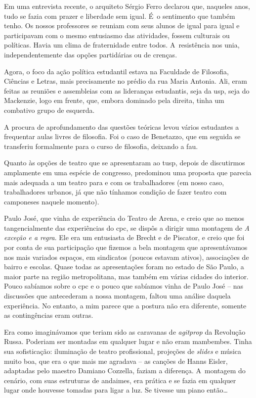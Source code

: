 Em uma entrevista recente, o arquiteto Sérgio Ferro declarou que,
naqueles anos, tudo se fazia com prazer e liberdade sem igual. É~o
sentimento que também tenho. Os nossos professores se reuniam com seus
alunos de igual para igual e participavam com o mesmo entusiasmo das
atividades, fossem culturais ou políticas. Havia um clima de
fraternidade entre todos. A~resistência nos unia, independentemente das
opções partidárias ou de crenças.

Agora, o foco da ação política estudantil estava na Faculdade de
Filosofia, Ciências e Letras, mais precisamente no prédio da rua Maria
Antonia. Ali, eram feitas as reuniões e assembleias com as
lideranças estudantis, seja da {\sc usp}, seja do Mackenzie, logo em frente, que,
embora dominado pela direita, tinha um combativo grupo de esquerda.

A procura de aprofundamento das questões teóricas levou vários
estudantes a frequentar aulas livres de filosofia. Foi o caso de
Benetazzo, que em seguida se transferiu formalmente para o curso de filosofia,
deixando a {\sc fau}.

Quanto às opções de teatro que se apresentaram ao {\sc tusp}, depois de
discutirmos amplamente em uma espécie de congresso,
predominou uma proposta que parecia mais adequada a um teatro para e com
os trabalhadores (em nosso caso, trabalhadores urbanos, já que não
tínhamos condição de fazer teatro com camponeses naquele momento).

Paulo José, que vinha de experiência do Teatro de Arena, e creio que ao
menos tangencialmente das experiências do {\sc cpc}, se dispôs a dirigir uma
montagem de {\it A exceção e a regra}. Ele era um entusiasta de Brecht e
de Piscator, e creio que foi por conta de sua participação que fizemos a bela
montagem que apresentávamos nos mais variados
espaços, em sindicatos (poucos estavam ativos), associações de bairro e
escolas. Quase todas as apresentações foram no estado de São Paulo, a
maior parte na região metropolitana, mas também em várias cidades do
interior. Pouco sabíamos sobre o {\sc cpc} e o pouco que sabíamos vinha de
Paulo José -- nas discussões que antecederam a nossa montagem, faltou uma
análise daquela experiência. No entanto, a mim parece que a postura não
era diferente, somente as contingências eram outras.

Era como imaginávamos que teriam sido as caravanas de {\it agitprop} da
Revolução Russa. Poderiam ser montadas em qualquer lugar e não eram
mambembes. Tinha sua sofisticação: iluminação de teatro profissional,
projeções de {\it slides} e música muito boa, que era o que mais me agradava -- as
canções de Hanns Eisler, adaptadas pelo maestro Damiano Cozzella, faziam a
diferença. A~montagem do cenário, com suas estruturas de andaimes, era
prática e se fazia em qualquer lugar onde houvesse tomadas para ligar a
luz. Se tivesse um piano então\ldots{}

